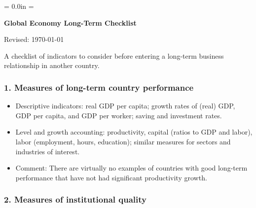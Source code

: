 \documentclass[letterpaper,12pt]{article}
\def\HeadName{Global Economy Long-Term Checklist}
\begin{document}
\parindent = 0.0in
\parskip = \bigskipamount
\thispagestyle{empty}%
\Head

\centerline{\large \bf \HeadName}%
\centerline{Revised:  \today}

\bigskip
A checklist of indicators to consider before entering a
long-term business relationship in another country.

\subsubsection*{1. Measures of long-term country performance}

\renewcommand{\labelitemi}{$\Box$}
\begin{itemize}
\item Descriptive indicators:  real GDP per capita; growth rates of (real) GDP, GDP per capita, and GDP per worker; saving and investment rates.
\item Level and growth accounting:  productivity,
    capital (ratios to GDP and labor),
    labor (employment, hours, education);
    similar measures for sectors and industries of interest.
\item Comment:  There are virtually no examples of countries with good long-term performance that have not had significant
    productivity growth.
\end{itemize}

\subsubsection*{2. Measures of institutional quality}
\end{document}

